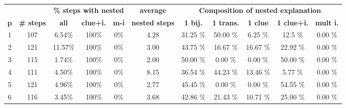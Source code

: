 \begin{table}
	\centering
	\begin{tabular}{c|c|ccc|c|ccccc}
		           &                    &  \multicolumn{3}{c|}{\textbf{\% steps with nested}} & \multicolumn{1}{c|}{\textbf{average}} & \multicolumn{5}{c}{\textbf{Composition of nested explanation }}                                                                                       \\
		\textbf{p} & \textbf{\# steps } & \textbf{all}     & \textbf{clue+i.}                                & \textbf{m-i}          & \textbf{nested steps}                  & \textbf{1 bij.} & \textbf{1 trans.} & \textbf{1 clue} & \textbf{1 clue+i.} & \textbf{mult i.} \\\hline
		1          & 107                & 6.54\%             & 100\%                                              & 0\%                   & 4.28                                                                   & 31.25 \%      & 50.00 \%        & 6.25 \%       & 12.5 \%            & 0.00 \%      \\
		2          & 121                & 11.57\%            & 100\%                                              & 0\%                   & 3.00                                                                   & 43.75 \%      & 16.67 \%        & 16.67 \%      & 22.92 \%           & 0.00 \%      \\
		3          & 115                & 1.74\%             & 100\%                                              & 0\%                   & 2.00                                                                   & 50.00 \%      & 0.00 \%         & 0.00 \%       & 50.00 \%           & 0.00 \%      \\
		4          & 111                & 4.50\%             & 100\%                                              & 0\%                   & 8.15                                                                   & 36.54 \%      & 44.23 \%        & 13.46 \%      & 5.77 \%            & 0.00 \%      \\
		5          & 121                & 4.96\%             & 100\%                                              & 0\%                   & 2.77                                                                   & 45.45 \%      & 0.00 \%         & 0.00 \%       & 54.55 \%           & 0.00 \%      \\
		6          & 116                & 3.45\%             & 100\%                                              & 0\%                   & 3.68                                                                   & 42.86 \%      & 21.43 \%        & 10.71 \%      & 25.00 \%           & 0.00 \%      \\

\end{tabular}
\end{table}
